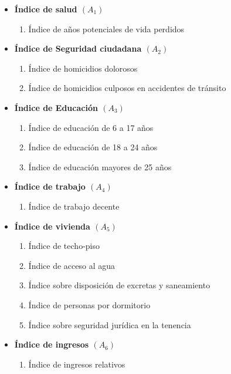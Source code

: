 \documentclass[
  11pt,
]{book}
\providecommand{\tightlist}{%
  \setlength{\itemsep}{0pt}\setlength{\parskip}{0pt}}
\begin{document}
\begin{itemize}
\tightlist
\item
  \textbf{Índice de salud \((A_1)\)}

  \begin{enumerate}
  \def\labelenumi{\arabic{enumi}.}
  \tightlist
  \item
    Índice de años potenciales de vida perdidos
  \end{enumerate}
\item
  \textbf{Índice de Seguridad ciudadana \((A_2)\)}

  \begin{enumerate}
  \def\labelenumi{\arabic{enumi}.}
  \setcounter{enumi}{1}
  \tightlist
  \item
    Índice de homicidios dolorosos
  \item
    Índice de homicidios culposos en accidentes de tránsito
  \end{enumerate}
\item
  \textbf{Índice de Educación \((A_3)\)}

  \begin{enumerate}
  \def\labelenumi{\arabic{enumi}.}
  \setcounter{enumi}{3}
  \tightlist
  \item
    Índice de educación de 6 a 17 años
  \item
    Índice de educación de 18 a 24 años
  \item
    Índice de educación mayores de 25 años
  \end{enumerate}
\item
  \textbf{Índice de trabajo \((A_4)\)}

  \begin{enumerate}
  \def\labelenumi{\arabic{enumi}.}
  \setcounter{enumi}{6}
  \tightlist
  \item
    Índice de trabajo decente
  \end{enumerate}
\item
  \textbf{Índice de vivienda \((A_5)\)}

  \begin{enumerate}
  \def\labelenumi{\arabic{enumi}.}
  \setcounter{enumi}{7}
  \tightlist
  \item
    Índice de techo-piso
  \item
    Índice de acceso al agua
  \item
    Índice sobre disposición de excretas y saneamiento
  \item
    Índice de personas por dormitorio
  \item
    Índice sobre seguridad jurídica en la tenencia
  \end{enumerate}
\item
  \textbf{Índice de ingresos \((A_6)\)}

  \begin{enumerate}
  \def\labelenumi{\arabic{enumi}.}
  \setcounter{enumi}{12}
  \tightlist
  \item
    Índice de ingresos relativos
  \end{enumerate}
\end{itemize}
\end{document}
